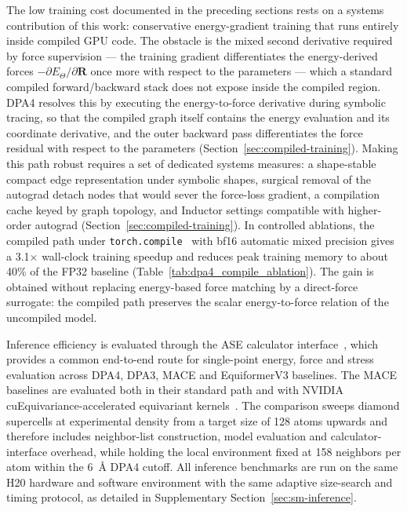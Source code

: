 The low training cost documented in the preceding sections rests on a systems contribution of this work: conservative energy-gradient training that runs entirely inside compiled GPU code.
The obstacle is the mixed second derivative required by force supervision --- the training gradient differentiates the energy-derived forces $-\partial E_{\Theta}/\partial\mathbf{R}$ once more with respect to the parameters --- which a standard compiled forward/backward stack does not expose inside the compiled region.
DPA4 resolves this by executing the energy-to-force derivative during symbolic tracing, so that the compiled graph itself contains the energy evaluation and its coordinate derivative, and the outer backward pass differentiates the force residual with respect to the parameters (Section~\ref{sec:compiled-training}).
Making this path robust requires a set of dedicated systems measures: a shape-stable compact edge representation under symbolic shapes, surgical removal of the autograd detach nodes that would sever the force-loss gradient, a compilation cache keyed by graph topology, and Inductor settings compatible with higher-order autograd (Section~\ref{sec:compiled-training}).
In controlled ablations, the compiled path under \texttt{torch.compile}~\cite{ansel2024pytorch2} with bf16 automatic mixed precision gives a 3.1$\times$ wall-clock training speedup and reduces peak training memory to about 40\% of the FP32 baseline (Table~\ref{tab:dpa4_compile_ablation}).
The gain is obtained without replacing energy-based force matching by a direct-force surrogate: the compiled path preserves the scalar energy-to-force relation of the uncompiled model.

Inference efficiency is evaluated through the ASE calculator interface~\cite{ase-paper}, which provides a common end-to-end route for single-point energy, force and stress evaluation across DPA4, DPA3, MACE and EquiformerV3 baselines.
The MACE baselines are evaluated both in their standard path and with NVIDIA cuEquivariance-accelerated equivariant kernels~\cite{nvidia_cuequivariance}.
The comparison sweeps diamond supercells at experimental density from a target size of 128 atoms upwards and therefore includes neighbor-list construction, model evaluation and calculator-interface overhead, while holding the local environment fixed at 158 neighbors per atom within the 6~\AA{} DPA4 cutoff.
All inference benchmarks are run on the same H20 hardware and software environment with the same adaptive size-search and timing protocol, as detailed in Supplementary Section~\ref{sec:sm-inference}.

